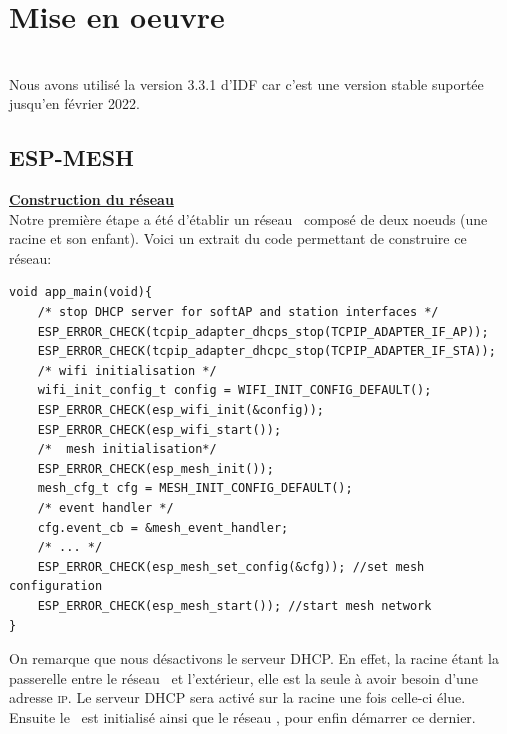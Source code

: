 \chapter{Mise en oeuvre}
    \\
    Nous avons utilisé la version 3.3.1 d'IDF car c'est une version stable suportée jusqu'en février 2022.
    \section{ESP-MESH}
        \textbf{\underline{Construction du réseau}}\\
            Notre première étape a été d'établir un réseau \espmesh\ composé de deux noeuds (une racine et son enfant).
            Voici un extrait du code permettant de construire ce réseau:
            \begin{verbatim}
void app_main(void){
    /* stop DHCP server for softAP and station interfaces */
    ESP_ERROR_CHECK(tcpip_adapter_dhcps_stop(TCPIP_ADAPTER_IF_AP));
    ESP_ERROR_CHECK(tcpip_adapter_dhcpc_stop(TCPIP_ADAPTER_IF_STA));
    /* wifi initialisation */ 
    wifi_init_config_t config = WIFI_INIT_CONFIG_DEFAULT();
    ESP_ERROR_CHECK(esp_wifi_init(&config));
    ESP_ERROR_CHECK(esp_wifi_start());
    /*  mesh initialisation*/
    ESP_ERROR_CHECK(esp_mesh_init());
    mesh_cfg_t cfg = MESH_INIT_CONFIG_DEFAULT();
    /* event handler */
    cfg.event_cb = &mesh_event_handler;
    /* ... */
    ESP_ERROR_CHECK(esp_mesh_set_config(&cfg)); //set mesh configuration
    ESP_ERROR_CHECK(esp_mesh_start()); //start mesh network
}
            \end{verbatim}
            On remarque que nous désactivons le serveur DHCP. En effet, la racine étant la passerelle entre 
            le réseau \espmesh\ et l'extérieur, elle est la seule à avoir besoin d'une adresse \textsc{ip}.
            Le serveur DHCP sera activé sur la racine une fois celle-ci élue.
            Ensuite le \wifi\ est initialisé ainsi que le réseau \espmesh, pour enfin démarrer ce dernier.\\
            
